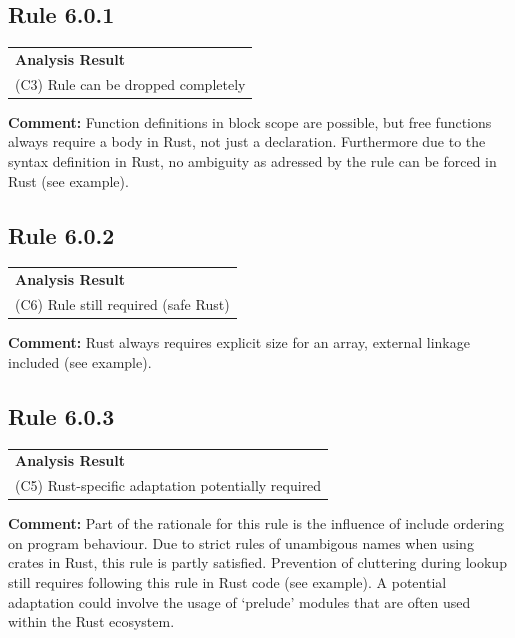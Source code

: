 \subsection*{Rule 6.0.1}
\begin{longtable}{p{13cm}}
\textbf{Analysis Result} \\
(C3) Rule can be dropped completely \\
\end{longtable}
\textbf{Comment:} Function definitions in block scope are possible, but free functions always require a body in Rust, not just a declaration. Furthermore due to the syntax definition in Rust, no ambiguity as adressed by the rule can be forced in Rust (see example). \\


\subsection*{Rule 6.0.2}
\begin{longtable}{p{13cm}}
\textbf{Analysis Result} \\
(C6) Rule still required (safe Rust) \\
\end{longtable}
\textbf{Comment:} Rust always requires explicit size for an array, external linkage included (see example). \\


\subsection*{Rule 6.0.3}
\begin{longtable}{p{13cm}}
\textbf{Analysis Result} \\
(C5) Rust-specific adaptation potentially required \\
\end{longtable}
\textbf{Comment:} Part of the rationale for this rule is the influence of include ordering on program behaviour. Due to strict rules of unambigous names when using crates in Rust, this rule is partly satisfied. Prevention of cluttering during lookup still requires following this rule in Rust code (see example). A potential adaptation could involve the usage of `prelude' modules that are often used within the Rust ecosystem. \\


